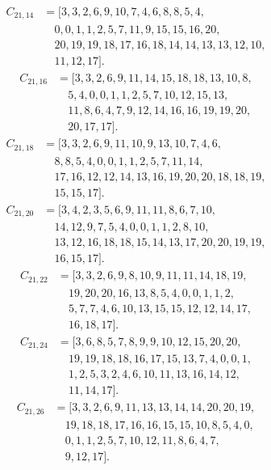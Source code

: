 \documentclass[11pt,a4paper]{article}
\theoremstyle{definition}\newtheorem{definition}[theorem]{Definition}
\theoremstyle{remark}\newtheorem{remark}[theorem]{Remark}
\begin{document}
\[\begin{aligned}
C_{21,14}&=[3,3,2,6,9,10,7,4,6,8,8,5,4,\\
&\quad 0,0,1,1,2,5,7,11,9,15,15,16,20,\\
&\quad 20,19,19,18,17,16,18,14,14,13,13,12,10,\\
&\quad 11,12,17].
\end{aligned}\]
\[\begin{aligned}
C_{21,16}&=[3,3,2,6,9,11,14,15,18,18,13,10,8,\\
&\quad 5,4,0,0,1,1,2,5,7,10,12,15,13,\\
&\quad 11,8,6,4,7,9,12,14,16,16,19,19,20,\\
&\quad 20,17,17].
\end{aligned}\]
\[\begin{aligned}
C_{21,18}&=[3,3,2,6,9,11,10,9,13,10,7,4,6,\\
&\quad 8,8,5,4,0,0,1,1,2,5,7,11,14,\\
&\quad 17,16,12,12,14,13,16,19,20,20,18,18,19,\\
&\quad 15,15,17].
\end{aligned}\]
\[\begin{aligned}
C_{21,20}&=[3,4,2,3,5,6,9,11,11,8,6,7,10,\\
&\quad 14,12,9,7,5,4,0,0,1,1,2,8,10,\\
&\quad 13,12,16,18,18,15,14,13,17,20,20,19,19,\\
&\quad 16,15,17].
\end{aligned}\]
\[\begin{aligned}
C_{21,22}&=[3,3,2,6,9,8,10,9,11,11,14,18,19,\\
&\quad 19,20,20,16,13,8,5,4,0,0,1,1,2,\\
&\quad 5,7,7,4,6,10,13,15,15,12,12,14,17,\\
&\quad 16,18,17].
\end{aligned}\]
\[\begin{aligned}
C_{21,24}&=[3,6,8,5,7,8,9,9,10,12,15,20,20,\\
&\quad 19,19,18,18,16,17,15,13,7,4,0,0,1,\\
&\quad 1,2,5,3,2,4,6,10,11,13,16,14,12,\\
&\quad 11,14,17].
\end{aligned}\]
\[\begin{aligned}
C_{21,26}&=[3,3,2,6,9,11,13,13,14,14,20,20,19,\\
&\quad 19,18,18,17,16,16,15,15,10,8,5,4,0,\\
&\quad 0,1,1,2,5,7,10,12,11,8,6,4,7,\\
&\quad 9,12,17].
\end{aligned}\]
\end{document}
